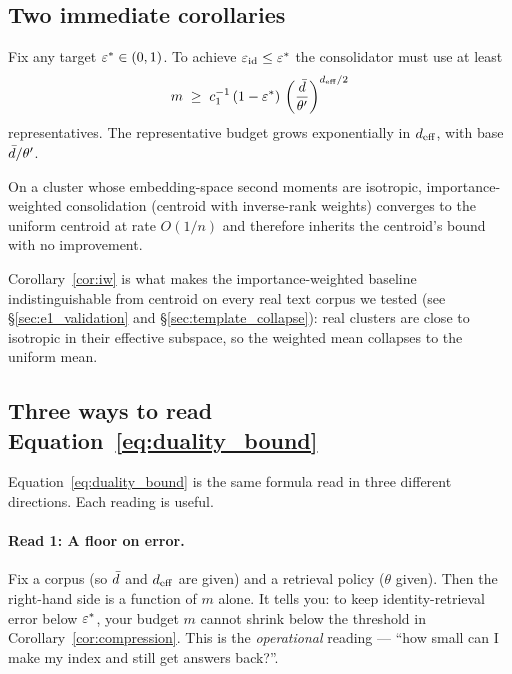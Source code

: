 \subsection{Two immediate corollaries}

\begin{corollary}
\label{cor:compression}
Fix any target $\varepsilon^\ast \in (0, 1)$. To achieve $\varepsilon_{\mathrm{id}} \leq
\varepsilon^\ast$ the consolidator must use at least
\begin{equation}
m \;\geq\; c_1^{-1}\,(1 - \varepsilon^\ast)\,\left(\frac{\bar{d}}{\theta'}\right)^{{d_{\mathrm{eff}}}/2}
\label{eq:compression_bound}
\end{equation}
representatives. The representative budget grows exponentially in ${d_{\mathrm{eff}}}$,
with base $\bar{d} / \theta'$.
\end{corollary}

\begin{corollary}
\label{cor:iw}
On a cluster whose embedding-space second moments are isotropic,
importance-weighted consolidation (centroid with inverse-rank weights)
converges to the uniform centroid at rate $O(1/n)$ and therefore inherits
the centroid's bound with no improvement.
\end{corollary}

Corollary~\ref{cor:iw} is what makes the importance-weighted baseline
indistinguishable from centroid on every real text corpus we tested (see
\S\ref{sec:e1_validation} and \S\ref{sec:template_collapse}): real
clusters are close to isotropic in their effective subspace, so the
weighted mean collapses to the uniform mean.

\subsection{Three ways to read Equation~\eqref{eq:duality_bound}}
\label{sec:duality:readings}

Equation~\eqref{eq:duality_bound} is the same formula read in three
different directions. Each reading is useful.

\paragraph{Read 1: A floor on error.} Fix a corpus (so $\bar{d}$ and
${d_{\mathrm{eff}}}$ are given) and a retrieval policy ($\theta$ given). Then the
right-hand side is a function of $m$ alone. It tells you: to keep
identity-retrieval error below $\varepsilon^\ast$, your budget $m$ cannot
shrink below the threshold in Corollary~\ref{cor:compression}. This is
the \emph{operational} reading --- ``how small can I make my index and
still get answers back?''.

